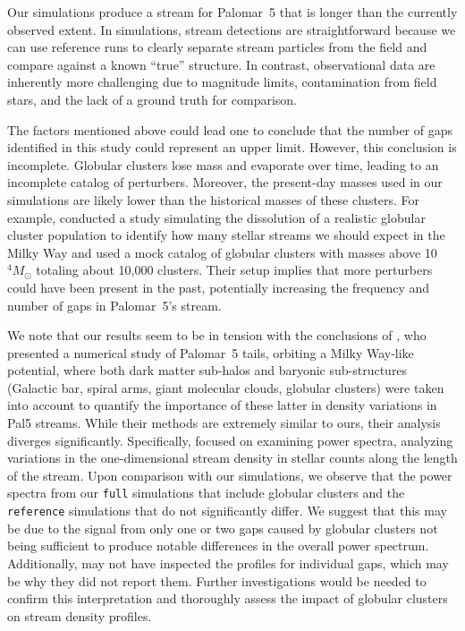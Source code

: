 \documentclass{aa}
\begin{document}
  
  Our simulations produce a stream for Palomar~5 that is longer than the currently observed extent. In simulations, stream detections are straightforward because we can use reference runs to clearly separate stream particles from the field and compare against a known ``true'' structure. In contrast, observational data are inherently more challenging due to magnitude limits, contamination from field stars, and the lack of a ground truth for comparison. 
  
  The factors mentioned above could lead one to conclude that the number of gaps identified in this study could represent an upper limit. However, this conclusion is incomplete. Globular clusters lose mass and evaporate over time, leading to an incomplete catalog of perturbers. Moreover, the present-day masses used in our simulations are likely lower than the historical masses of these clusters. For example, \citet{2024ApJ...976...54P} conducted a study simulating the dissolution of a realistic globular cluster population to identify how many stellar streams we should expect in the Milky Way and used a mock catalog of globular clusters with masses above 10$^4 M_\odot$ totaling about 10,000 clusters. Their setup implies that more perturbers could have been present in the past, potentially increasing the frequency and number of gaps in Palomar~5's stream.
  

  We note that our results seem to be in tension with the conclusions of \citet{2019MNRAS.484.2009B}, who presented a numerical study of Palomar~5 tails, orbiting a Milky Way-like potential, where both dark matter sub-halos and baryonic sub-structures (Galactic bar, spiral arms, giant molecular clouds, globular clusters) were taken into account to quantify the importance of these latter in density variations in Pal5 streams. While their methods are extremely similar to ours, their analysis diverges significantly. Specifically, \citet{2019MNRAS.484.2009B} focused on examining power spectra, analyzing variations in the one-dimensional stream density in stellar counts along the length of the stream. Upon comparison with our simulations, we observe that the power spectra from our \texttt{full} simulations that include globular clusters and the \texttt{reference} simulations that do not significantly differ. We suggest that this may be due to the signal from only one or two gaps caused by globular clusters not being sufficient to produce notable differences in the overall power spectrum. Additionally, \citet{2019MNRAS.484.2009B} may not have inspected the profiles for individual gaps, which may be why they did not report them. Further investigations would be needed to confirm this interpretation and thoroughly assess the impact of globular clusters on stream density profiles. \\
\end{document}
